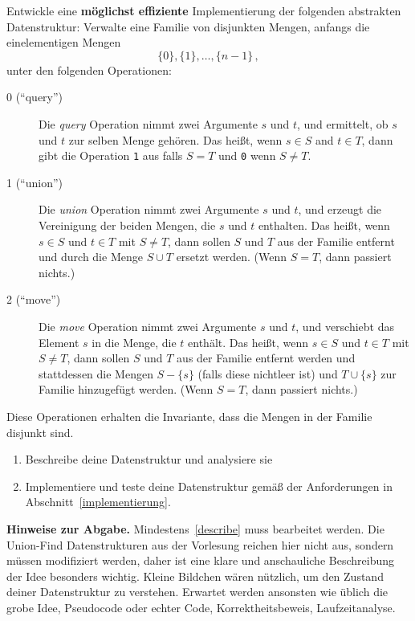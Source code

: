 \documentclass{uebung_cs}
\begin{document}
  Entwickle eine \textbf{möglichst effiziente} Implementierung der folgenden abstrakten Datenstruktur:
  Verwalte eine Familie von disjunkten Mengen, anfangs die einelementigen Mengen
  \[ \{0\},\{1\}, \ldots,\{n-1\}\,,\]
  unter den folgenden Operationen:
  \begin{description}
   \item[0 (\enquote{query})]
      Die \emph{query} Operation nimmt zwei Argumente $s$ und $t$, und ermittelt, ob $s$ und $t$ zur selben Menge gehören.
      Das heißt, wenn $s\in S$ and $t\in T$, dann gibt die Operation \texttt{1} aus falls $S=T$ und \texttt{0} wenn $S\neq T$.
    \item[1 (\enquote{union})]
    Die \emph{union} Operation nimmt zwei Argumente $s$ und $t$, und erzeugt die Vereinigung der beiden Mengen, die $s$ und $t$ enthalten.
    Das heißt, wenn $s\in S$ und $t\in T$ mit $S\neq T$, dann sollen $S$ und $T$ aus der Familie entfernt und durch die Menge $S\cup T$ ersetzt werden.
      (Wenn $S=T$, dann passiert nichts.)
    \item[2 (\enquote{move})]
      Die \emph{move} Operation nimmt zwei Argumente $s$ und $t$, und verschiebt das Element $s$ in die Menge, die $t$ enthält.
      Das heißt, wenn $s\in S$ und $t\in T$ mit $S\neq T$, dann sollen $S$ und $T$ aus der Familie entfernt werden und stattdessen die Mengen $S-\{s\}$ (falls diese nichtleer ist)  und $T\cup\{s\}$ zur Familie hinzugefügt werden.
      (Wenn $S= T$, dann passiert nichts.)
  \end{description}
  Diese Operationen erhalten die Invariante, dass die Mengen in der Familie disjunkt sind.
  
  \begin{enumerate}
    \item\label{describe} Beschreibe deine Datenstruktur und analysiere sie
    \item\label{implement} Implementiere und teste deine Datenstruktur gemäß der Anforderungen in Abschnitt~\ref{implementierung}.
  \end{enumerate}

  \textbf{Hinweise zur Abgabe.}
  Mindestens~\ref{describe} muss bearbeitet werden.
  Die Union-Find Datenstrukturen aus der Vorlesung reichen hier nicht aus, sondern müssen modifiziert werden, daher ist eine klare und anschauliche Beschreibung der Idee besonders wichtig. Kleine Bildchen wären nützlich, um den Zustand deiner Datenstruktur zu verstehen.
  Erwartet werden ansonsten wie üblich die grobe Idee, Pseudocode oder echter Code, Korrektheitsbeweis, Laufzeitanalyse.
\end{document}
